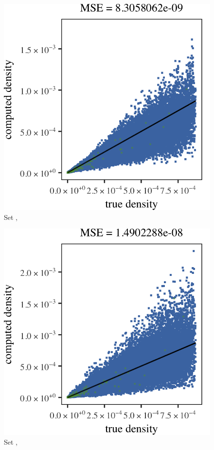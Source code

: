 
\begin{subfigure}{0.23\textwidth}
	\centering
	\includegraphics[keepaspectratio=true, width=\textwidth, height=0.23\textheight]{result/img/results_ferdosi_1_60000_mbe_silverman}
	\caption{Set \ferdosiOne, \mbe}
	\label{fig:results:singlesphere:mbe:ferdosi1}
\end{subfigure}
\begin{subfigure}{0.23\textwidth}
	\centering
	\includegraphics[keepaspectratio=true, width=\textwidth, height=0.23\textheight]{result/img/results_baakman_1_60000_mbe_silverman}
	\caption{Set \baakmanOne, \mbe}
	\label{fig:results:singlesphere:mbe:baakman1}
\end{subfigure}
